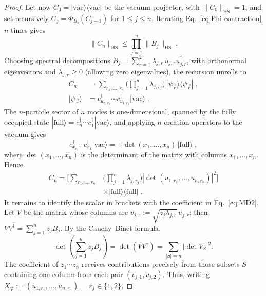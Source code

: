 \documentclass[aps,prl,twocolumn,superscriptaddress,reprint,longbibliography,nofootinbib]{revtex4-2}
\begin{document}
\begin{proof}
Let now $C_0=|\mathrm{vac}\rangle\langle\mathrm{vac}|$ be the vacuum projector, with $\|C_0\|_{\mathrm{HS}}=1$, and set recursively $C_j=\Phi_{B_j}(C_{j-1})$ for $1\le j\le n$. Iterating Eq.~\eqref{eq:Phi-contraction} $n$ times gives
\begin{equation}
    \|C_n\|_{\mathrm{HS}}\le\prod_{j=1}^n\|B_j\|_{\mathrm{HS}}\;.
    \label{eq:Cn-bound}
\end{equation}
Choosing spectral decompositions $B_j=\sum_{r=1}^2\lambda_{j,r}\,u_{j,r}u_{j,r}^\dagger$, with orthonormal eigenvectors and $\lambda_{j,r}\ge0$ (allowing zero eigenvalues), the recursion unrolls to
\begin{equation}
\begin{split}
    C_n&=\sum_{r_1,\dots,r_n}\Big(\prod_{j=1}^n\lambda_{j,r_j}\Big)\,|\psi_{\vec r}\rangle\langle\psi_{\vec r}|\;,\\
    |\psi_{\vec r}\rangle&=c^\dagger_{u_{n,r_n}}\cdots c^\dagger_{u_{1,r_1}}|\mathrm{vac}\rangle\;.
    \end{split}
\end{equation}
The $n$-particle sector of $n$ modes is one-dimensional, spanned by the fully occupied state $|\mathrm{full}\rangle=c_n^\dagger\cdots c_1^\dagger|\mathrm{vac}\rangle$, and applying $n$ creation operators to the vacuum gives
\begin{equation}
    c^\dagger_{x_n}\cdots c^\dagger_{x_1}|\mathrm{vac}\rangle=\pm\det(x_1,\dots,x_n)\,|\mathrm{full}\rangle\;,
\end{equation}
where $\det(x_1,\dots,x_n)$ is the determinant of the matrix with columns $x_1,\dots,x_n$. Hence
\begin{equation}
\begin{split}C_n=\Big[\sum_{r_1,\dots,r_n}&\Big(\prod_{j=1}^n\lambda_{j,r_j}\Big)\left|\det(u_{1,r_1},\dots,u_{n,r_n})\right|^2\Big]\\
    &\times|\mathrm{full}\rangle\langle\mathrm{full}|\;.
\end{split}
\label{eq:Cn-scalar}
\end{equation}
It remains to identify the scalar in brackets with the coefficient in Eq.~\eqref{eq:MD2}. 
Let $V$ be the matrix whose columns are $v_{j,r}:=\sqrt{z_j\lambda_{j,r}}\,u_{j,r}$;
then $VV^\dagger=\sum_{j=1}^n z_jB_j$. By the Cauchy--Binet formula,
\begin{equation}
    \det\!\left(\sum_{j=1}^n z_jB_j\right)
=\det(VV^\dagger)
=\sum_{|S|=n} |\det V_S|^2 .
\end{equation}
The coefficient of $z_1\cdots z_n$ receives contributions precisely from
those subsets $S$ containing one column from each pair $(v_{j,1},v_{j,2})$. Thus, writing $X_{\vec r}:=(u_{1,r_1},\ldots,u_{n,r_n}),
\quad r_j\in\{1,2\}$,


\end{proof}
\end{document}
